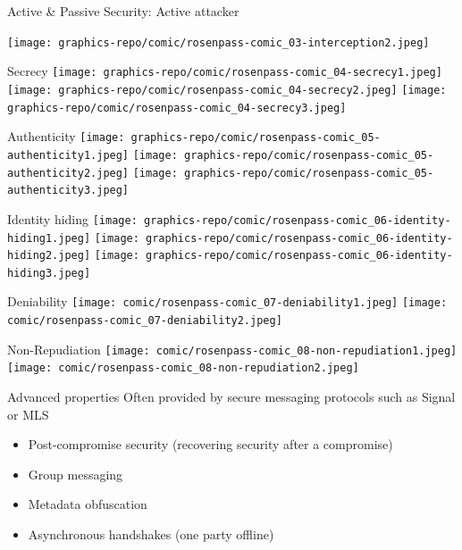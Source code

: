 \begin{frame}{Active \& Passive Security: Active attacker}
  \raggedright
  \texttt{[image: graphics-repo/comic/rosenpass-comic\_03-interception2.jpeg]}
\end{frame}

\begin{frame}{Secrecy}
  \centering
  \texttt{[image: graphics-repo/comic/rosenpass-comic\_04-secrecy1.jpeg]}
  \texttt{[image: graphics-repo/comic/rosenpass-comic\_04-secrecy2.jpeg]}
  \texttt{[image: graphics-repo/comic/rosenpass-comic\_04-secrecy3.jpeg]}
\end{frame}

\begin{frame}{Authenticity}
  \centering
  \texttt{[image: graphics-repo/comic/rosenpass-comic\_05-authenticity1.jpeg]}
  \texttt{[image: graphics-repo/comic/rosenpass-comic\_05-authenticity2.jpeg]}
  \texttt{[image: graphics-repo/comic/rosenpass-comic\_05-authenticity3.jpeg]}
\end{frame}

\begin{frame}{Identity hiding}
  \centering
  \texttt{[image: graphics-repo/comic/rosenpass-comic\_06-identity-hiding1.jpeg]}
  \texttt{[image: graphics-repo/comic/rosenpass-comic\_06-identity-hiding2.jpeg]}
  \texttt{[image: graphics-repo/comic/rosenpass-comic\_06-identity-hiding3.jpeg]}
\end{frame}

\begin{frame}{Deniability}
  \centering
  \texttt{[image: comic/rosenpass-comic\_07-deniability1.jpeg]}
  \texttt{[image: comic/rosenpass-comic\_07-deniability2.jpeg]}
\end{frame}

\begin{frame}{Non-Repudiation}
  \centering
  \texttt{[image: comic/rosenpass-comic\_08-non-repudiation1.jpeg]}
  \texttt{[image: comic/rosenpass-comic\_08-non-repudiation2.jpeg]}
\end{frame}

\begin{frame}{Advanced properties}
  Often provided by secure messaging protocols such as Signal or MLS

  \begin{itemize}
    \item Post-compromise security (recovering security after a compromise)
    \item Group messaging
    \item Metadata obfuscation
    \item Asynchronous handshakes (one party offline)
  \end{itemize}
\end{frame}

